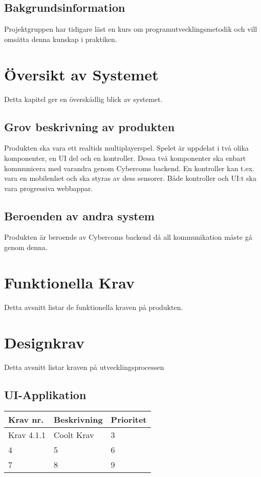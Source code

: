\documentclass[10pt]{article}
\begin{document}
	\subsection{Bakgrundsinformation}
		Projektgruppen har tidigare läst en kurs om programutvecklingsmetodik och vill omsätta denna kunskap i praktiken. 
	
\section{Översikt av Systemet}
	Detta kapitel ger en överskådlig blick av systemet.

	\subsection{Grov beskrivning av produkten}
	Produkten ska vara ett realtids multiplayerspel. Spelet är uppdelat i två olika komponenter, en UI del och en kontroller. Dessa två komponenter ska enbart kommunicera med varandra genom Cybercoms backend. En kontroller kan t.ex. vara en mobilenhet och ska styras av dess sensorer. Både kontroller och UI:t ska vara progressiva webbappar. 
	
	
	\subsection{Beroenden av andra system}
	Produkten är beroende av Cybercoms backend då all kommunikation måste gå genom denna. 

\section{Funktionella Krav}
	Detta avsnitt listar de funktionella kraven på produkten.
	
\section{Designkrav}
	Detta avsnitt listar kraven på utvecklingsprocessen

	\subsection{UI-Applikation}	
	
	\begin{tabular}{| l | l | l |}
		\hline
		\textbf{Krav nr.} & \textbf{Beskrivnin}g & \textbf{Prioritet} \\ \hline
		Krav 4.1.1 & Coolt Krav & 3\\ \hline
		4 & 5 & 6\\ \hline
		7 & 8 & 9\\ \hline
	\end{tabular}
	
\end{document}
